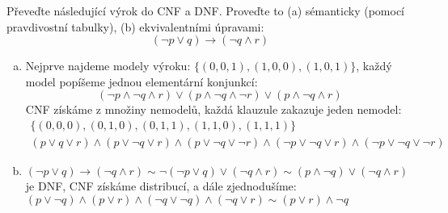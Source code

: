 \begin{problem} 
    
    Převeďte následující výrok do CNF a DNF. Proveďte to (a) sémanticky (pomocí pravdivostní tabulky), (b) ekvivalentními úpravami:
    $$
    (\neg p \vee q)\to (\neg q \wedge r)
    $$

    \begin{solution}
        \begin{enumerate}[(a)]
            \item Nejprve najdeme modely výroku: $\{(0,0,1),(1,0,0),(1,0,1)\}$, každý model popíšeme jednou elementární konjunkcí:
            $$
            (\neg p\land \neg q\land r)\lor
            (p\land \neg q\land \neg r)\lor
            (p\land \neg q\land r)
            $$
            CNF získáme z množiny nemodelů, každá klauzule zakazuje jeden nemodel:
            \begin{gather*}
                \{(0,0,0),(0,1,0),(0,1,1),(1,1,0),(1,1,1)\}\\
                (p\lor q\lor r)\land
                (p\lor \neg q\lor r)\land
                (p\lor \neg q\lor \neg r)\land
                (\neg p\lor \neg q\lor r)\land
                (\neg p\lor \neg q\lor \neg r)
            \end{gather*} 
            
            \item $(\neg p \vee q)\to (\neg q \wedge r)\sim \neg (\neg p \vee q)\lor (\neg q \wedge r)
            \sim (p \wedge \neg q)\lor (\neg q \wedge r)
            $ je DNF, CNF získáme distribucí, a dále zjednodušíme: $(p\lor \neg q)\land (p\lor r)\land (\neg q\lor\neg q)\land (\neg q\lor r)\sim (p\lor r)\land \neg q$
        \end{enumerate}
            
    \end{solution}
        
\end{problem}


